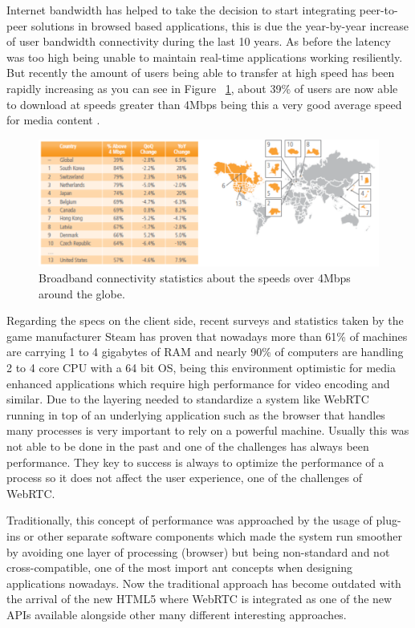 Internet bandwidth has helped to take the decision to start integrating peer-to-peer solutions in browsed based applications, this is due the year-by-year increase of user bandwidth connectivity during the last 10 years. As before the latency was too high being unable to maintain real-time applications working resiliently. But recently the amount of users being able to transfer at high speed has been rapidly increasing as you can see in Figure ~\ref{fig:bwWorldAvg}, about 39\% of users are now able to download at speeds greater than 4Mbps being this a very good average speed for media content \cite{akamaiq2}.

\begin{figure}[h]
  \centering
    \includegraphics[width=1\textwidth]{./figures/internetstats.pdf}
      \caption[Broadband over 4Mbps connectivity statistics]{Broadband connectivity statistics about the speeds over 4Mbps around the globe.}
	\label{fig:bwWorldAvg}
\end{figure}

Regarding the specs on the client side, recent surveys and statistics taken by the game manufacturer Steam  \cite{steamStats} has proven that nowadays more than  61\% of machines are carrying 1 to 4 gigabytes of RAM and nearly 90\% of computers are handling 2 to 4 core CPU with a 64 bit OS, being this environment optimistic for media enhanced applications which require high performance for video encoding and similar. Due to the layering needed to standardize a system like WebRTC running in top of an underlying application such as the browser that handles many processes is very important to rely on a powerful machine. Usually this was not able to be done in the past and one of the challenges has always been performance. They key to success is always to optimize the performance of a process so it does not affect the user experience, one of the challenges of WebRTC.

Traditionally, this concept of performance was approached by the usage of plug-ins or other separate software components which made the system run smoother by avoiding one layer of processing (browser) but being non-standard and not cross-compatible, one of the most import ant concepts when designing applications nowadays. Now the traditional approach has become outdated with the arrival of the new HTML5 where WebRTC is integrated as one of the new APIs available alongside other many different interesting approaches.


